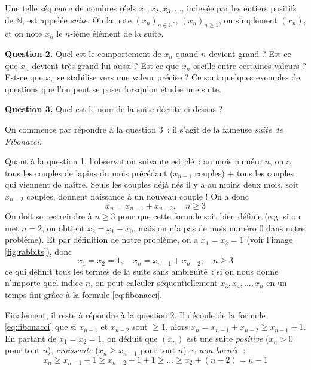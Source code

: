 \begin{boxdef}[Suite]
Une telle séquence de nombres réels $x_1, x_2, x_3, ...$, indexée par les entiers positifs de $\mathbb N$, est appelée \emph{suite}. On la note $(x_n)_{n \in \mathbb{N}^*}$, $(x_n)_{n \geq 1}$, ou simplement $(x_n)$, et on note $x_n$ le $n$-ième élément de la suite.
\label{def:suite}
\end{boxdef}

\begin{greybox}
\textbf{Question 2.} Quel est le comportement de $x_n$ quand $n$ devient grand ? Est-ce que $x_n$ devient très grand lui aussi ? Est-ce que $x_n$ oscille entre certaines valeurs ? Est-ce que $x_n$ se stabilise vers une valeur précise ? Ce sont quelques exemples de questions que l'on peut se poser lorsqu'on étudie une suite.
\end{greybox}

\begin{greybox}
\textbf{Question 3.} Quel est le nom de la suite décrite ci-dessus ?
\end{greybox}
On commence par répondre à la question 3~: il s'agit de la fameuse \emph{suite de Fibonacci}. 

Quant à la question 1, l'observation suivante est clé~: au mois numéro $n$, on a tous les couples de lapins du mois précédant ($x_{n-1}$ couples) + tous les couples qui viennent de naître. Seuls les couples déjà nés il y a au moins deux mois, soit $x_{n-2}$ couples, donnent naissance à un nouveau couple ! On a donc $$x_n = x_{n-1} + x_{n-2}, \quad n \geq 3$$ 
On doit se restreindre à $n \geq 3$ pour que cette formule soit bien définie (e.g. si on met $n = 2$, on obtient $x_2 = x_1 + x_0$, mais on n'a pas de mois numéro $0$ dans notre problème). Et par définition de notre problème, on a $x_1 = x_2 = 1$ (voir l'image \ref{fig:rabbits}), donc
\begin{equation}
    x_1 = x_2 = 1, \quad x_n = x_{n-1} + x_{n-2}, \quad n \geq 3
    \label{eq:fibonacci}
\end{equation}
ce qui définit tous les termes de la suite sans ambiguïté~: si on nous donne n'importe quel indice $n$, on peut calculer séquentiellement $x_3, x_4, ..., x_n$ en un temps fini grâce à la formule \ref{eq:fibonacci}.

Finalement, il reste à répondre à la question 2. Il découle de la formule \ref{eq:fibonacci} que si $x_{n-1}$ et $x_{n-2}$ sont $\geq 1$, alors $x_n = x_{n-1} + x_{n-2} \geq x_{n-1} + 1$. En partant de $x_1 = x_2 = 1$, on déduit que $(x_n)$ est une suite \emph{positive} ($x_n > 0$ pour tout $n$), \emph{croissante} ($x_n \geq x_{n-1}$ pour tout $n$) et \emph{non-bornée}~:
\begin{equation}
x_n \geq x_{n-1} + 1 \geq x_{n-2} + 1 + 1 \geq ... \geq x_2 + (n-2) = n-1
\label{eq:fibonacci_lower_bound}
\end{equation}

